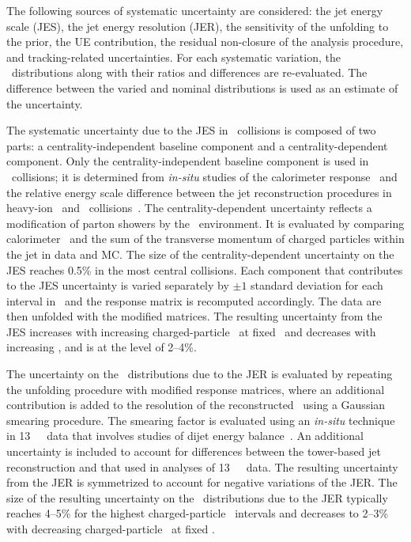 
The following sources of systematic uncertainty are considered:
the jet energy scale (JES), the jet energy resolution (JER), 
the sensitivity of the  unfolding to the prior, the UE contribution, the residual non-closure of the analysis procedure, and tracking-related uncertainties.
For each systematic variation, the \Dptr\ distributions along with their ratios and differences are re-evaluated. The difference between the varied and nominal distributions is used as an estimate of the uncertainty.

The systematic uncertainty due to the JES in \PbPb\ collisions is composed of two parts: 
a centrality-independent baseline component and a centrality-dependent component. Only the centrality-independent baseline component is used in \pp\ collisions; 
it is determined from \textit{in-situ} studies of the calorimeter
response~\cite{Aad:2011he,HIjesnote,Aaboud:2017jcu} and the relative energy scale difference between the jet reconstruction procedures in heavy-ion~\cite{HIjesnote} and \pp\ collisions~\cite{Aad:2014bia}. The centrality-dependent uncertainty reflects a modification of parton showers by the \PbPb\ environment. It is evaluated by comparing calorimeter \ptjet\ and the sum of the transverse momentum of charged particles within the jet in data and MC. The size of the centrality-dependent uncertainty on the JES reaches 0.5\% in the most central collisions. Each component that contributes to the JES uncertainty is varied separately by $\pm1$ standard deviation for each interval in \ptjet\ and the response matrix is recomputed accordingly. The data are then unfolded with the modified matrices. The resulting uncertainty from the JES increases with increasing charged-particle \pT\ at fixed \ptjet\ and decreases with increasing \ptjet, and is at the level of 2--4\%.

The uncertainty on the \Dptr\ distributions due to the JER is evaluated by repeating the unfolding procedure with modified response matrices, where an additional contribution is added to the resolution of the reconstructed \ptjet\ using a Gaussian smearing procedure. The smearing factor is evaluated using an \textit{in-situ} technique in 13~\TeV\ \pp\ data that involves studies of dijet energy balance~\cite{Aad:2012ag,JERConfNote}. An additional uncertainty is included to account for differences between the tower-based jet reconstruction and that used in analyses of 13~\TeV\ \pp\ data. The resulting uncertainty from the JER is symmetrized to account for negative variations of the JER.  The size of the resulting uncertainty on the \Dptr\ distributions due to the JER typically reaches 4--5\% for the highest charged-particle \pT\ intervals and decreases to 2--3\% with decreasing charged-particle \pT\ at fixed \ptjet.


